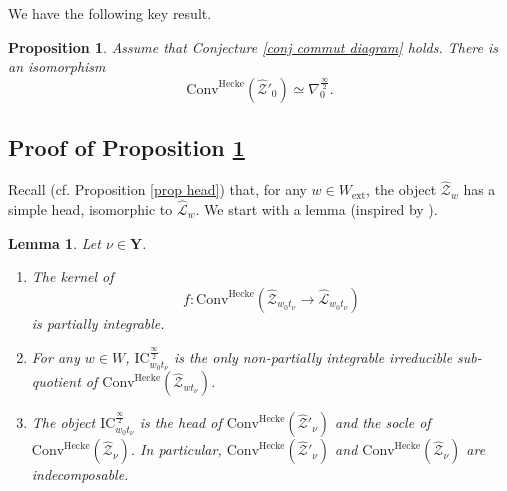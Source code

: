 \documentclass[11pt]{amsart}
\theoremstyle{plain}
\newtheorem{lem}[thm]{Lemma}
\newtheorem{prop}[thm]{Proposition}
\theoremstyle{remark}
\numberwithin{equation}{section}
\begin{document}
  We have the following key result.
\begin{prop}\label{proposition costandrad 0}
   Assume that Conjecture \ref{conj commut diagram} holds. There is an isomorphism
    \begin{equation}\label{eq costandrad 0}
        \mathrm{Conv}^{\mathrm{Hecke}}(\widehat{\mathcal{Z}}'_{0})\simeq \nabla_0^\frac{\infty}{2}.
    \end{equation}
\end{prop}


\subsection{Proof of Proposition \ref{proposition costandrad 0}} Recall (cf. Proposition \ref{prop head}) that, for any $w\in W_\mathrm{ext}$, the object $\widehat{\mathcal{Z}}_{w}$ has a simple head, isomorphic to $\widehat{\mathcal{L}}_{w}$. We start with a lemma (inspired by {\cite[Corollary 4.4.14]{ABBGM}}).
\begin{lem}\label{lem indecomposable} Let $\nu\in\mathbf{Y}$.
		\begin{enumerate}
			\item The kernel of 
   $$f:\mathrm{Conv}^{\mathrm{Hecke}}(\widehat{\mathcal{Z}}_{w_0t_\nu}\to\widehat{\mathcal{L}}_{w_0t_\nu})$$ 
   is partially integrable.
			\item For any $w\in W$, $\mathrm{IC}_{w_0t_\nu}^{\frac{\infty}{2}}$ is the only non-partially integrable irreducible sub-quotient of $\mathrm{Conv}^{\mathrm{Hecke}}(\widehat{\mathcal{Z}}_{wt_\nu})$.
			\item The object $\mathrm{IC}_{w_0t_\nu}^{\frac{\infty}{2}}$ is the head of $\mathrm{Conv}^{\mathrm{Hecke}}(\widehat{\mathcal{Z}}'_{\nu})$ and the socle of $\mathrm{Conv}^{\mathrm{Hecke}}(\widehat{\mathcal{Z}}_{\nu})$. In particular, $\mathrm{Conv}^{\mathrm{Hecke}}(\widehat{\mathcal{Z}}'_{\nu})$ and $\mathrm{Conv}^{\mathrm{Hecke}}(\widehat{\mathcal{Z}}_{\nu})$ are indecomposable.
		\end{enumerate}
	\end{lem}
\end{document}
